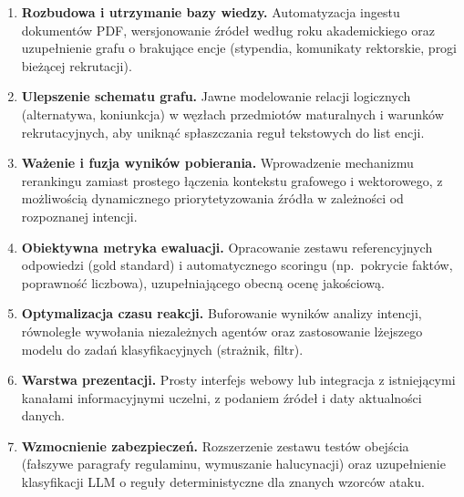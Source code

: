 \begin{tcolorbox}[colback=green!5!white,colframe=green!50!black,title=Proponowane kolejne kroki]
    \begin{enumerate}[leftmargin=*, nosep]
        \item \textbf{Rozbudowa i utrzymanie bazy wiedzy.}
              Automatyzacja ingestu dokumentów PDF, wersjonowanie źródeł według roku akademickiego
              oraz uzupełnienie grafu o brakujące encje (stypendia, komunikaty rektorskie, progi bieżącej rekrutacji).

        \item \textbf{Ulepszenie schematu grafu.}
              Jawne modelowanie relacji logicznych (alternatywa, koniunkcja) w węzłach przedmiotów maturalnych
              i warunków rekrutacyjnych, aby uniknąć spłaszczania reguł tekstowych do list encji.

        \item \textbf{Ważenie i fuzja wyników pobierania.}
              Wprowadzenie mechanizmu rerankingu zamiast prostego łączenia kontekstu grafowego i wektorowego,
              z możliwością dynamicznego priorytetyzowania źródła w zależności od rozpoznanej intencji.

        \item \textbf{Obiektywna metryka ewaluacji.}
              Opracowanie zestawu referencyjnych odpowiedzi (gold standard) i automatycznego scoringu
              (np.\ pokrycie faktów, poprawność liczbowa), uzupełniającego obecną ocenę jakościową.

        \item \textbf{Optymalizacja czasu reakcji.}
              Buforowanie wyników analizy intencji, równoległe wywołania niezależnych agentów
              oraz zastosowanie lżejszego modelu do zadań klasyfikacyjnych (strażnik, filtr).

        \item \textbf{Warstwa prezentacji.}
              Prosty interfejs webowy lub integracja z istniejącymi kanałami informacyjnymi uczelni,
              z podaniem źródeł i daty aktualności danych.

        \item \textbf{Wzmocnienie zabezpieczeń.}
              Rozszerzenie zestawu testów obejścia (fałszywe paragrafy regulaminu, wymuszanie halucynacji)
              oraz uzupełnienie klasyfikacji LLM o reguły deterministyczne dla znanych wzorców ataku.
    \end{enumerate}
\end{tcolorbox}

